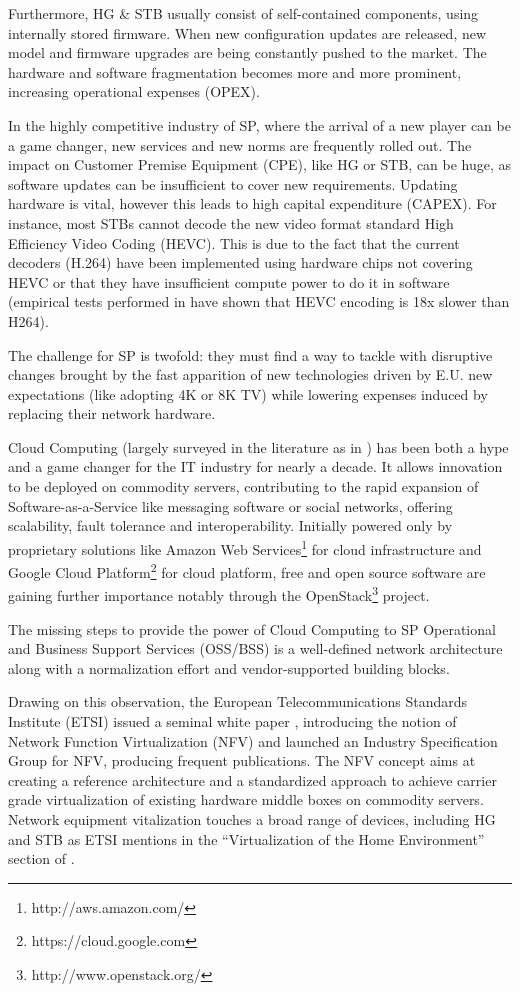Furthermore, HG \& STB usually consist of self-contained components, using internally stored firmware.
When new configuration updates are released, new model and firmware upgrades are being constantly pushed to the market.
The hardware and software fragmentation becomes more and more prominent, increasing operational expenses (OPEX). 

In the highly competitive industry of SP, where the arrival of a new player can be a game changer, new services and new norms are frequently rolled out.	
The impact on Customer Premise Equipment (CPE), like HG or STB, can be huge, as software updates can be insufficient to cover new requirements.
Updating hardware is vital, however this leads to high capital expenditure (CAPEX).
For instance, most STBs cannot decode the new video format standard  High Efficiency Video Coding (HEVC).
This is due to the fact that the current decoders (H.264) have been implemented using hardware chips not covering HEVC or that they have insufficient compute power to do it in software (empirical tests performed in \cite{grois_performance_2013} have shown that HEVC encoding is 18x slower than H264).

The challenge for SP is twofold: they must find a way to tackle with disruptive changes brought by the fast apparition of new technologies driven by E.U. new expectations (like adopting 4K or 8K TV) while lowering expenses induced by replacing their network hardware.

Cloud Computing (largely surveyed in the literature as in \cite{rimal_taxonomy_2009}) has been both a hype and a game changer for the IT industry for nearly a decade.
It allows innovation to be deployed on commodity servers, contributing to the rapid expansion of Software-as-a-Service like messaging software or social networks, offering scalability, fault tolerance and interoperability.
Initially powered only by proprietary solutions like Amazon Web Services\footnote{http://aws.amazon.com/} for cloud infrastructure and Google Cloud Platform\footnote{https://cloud.google.com} for cloud platform, free and open source software are gaining further importance notably through the OpenStack\footnote{http://www.openstack.org/} project. 

The missing steps to provide the power of Cloud Computing to SP Operational and Business Support Services (OSS/BSS) is a well-defined network architecture along with a normalization effort and vendor-supported building blocks.

Drawing on this observation, the European Telecommunications Standards Institute (ETSI) issued a seminal white paper \cite{_network_2012}, introducing the notion of Network Function Virtualization (NFV) and launched an Industry Specification Group for NFV, producing frequent publications.
The NFV concept aims at creating a reference architecture and a standardized approach to achieve carrier grade virtualization of existing hardware middle boxes on commodity servers.
Network equipment vitalization touches a broad range of devices, including HG and STB as ETSI mentions in the “Virtualization of the Home Environment” section of \cite{_network_2013}. 

